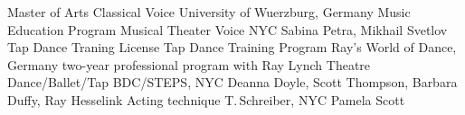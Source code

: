 \begin{cventries}
  \cventrytab
    {Master of Arts}
    {Classical Voice}
    {University of Wuerzburg, Germany}
    {Music Education Program}
 \cventrytab
    {}
    {Musical Theater Voice}
    {NYC}
    {Sabina Petra, Mikhail Svetlov}
    \cventrytab
      {Tap Dance Traning License}
      {Tap Dance Training Program}
      {Ray's World of Dance, Germany}
      {two-year professional program with Ray Lynch}
    \cventrytab
      {}
      {Theatre Dance/Ballet/Tap}
      {BDC/STEPS, NYC}
      {Deanna Doyle, Scott Thompson, Barbara Duffy, Ray Hesselink}
    \cventrytab
      {}
      {Acting technique}
      {T.\,Schreiber, NYC}
      {Pamela Scott}
\end{cventries}
